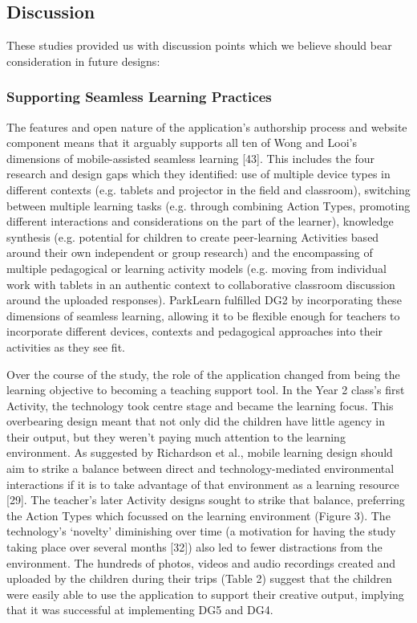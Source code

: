 \subsection{Discussion}
\label{sec:TeacherDiscussion}
These studies provided us with discussion points which we believe should bear consideration in future designs:

\subsubsection{Supporting Seamless Learning Practices}

The features and open nature of the application’s authorship process and website component means that it arguably supports all ten of Wong and Looi’s dimensions of mobile-assisted seamless learning [43].  This includes the four research and design gaps which they identified: use of multiple device types in different contexts (e.g. tablets and projector in the field and classroom), switching between multiple learning tasks (e.g. through combining Action Types, promoting different interactions and considerations on the part of the learner), knowledge synthesis (e.g. potential for children to create peer-learning Activities based around their own independent or group research) and the encompassing of multiple pedagogical or learning activity models (e.g. moving from individual work with tablets in an authentic context to collaborative classroom discussion around the uploaded responses). ParkLearn fulfilled DG2 by incorporating these dimensions of seamless learning, allowing it to be flexible enough for teachers to incorporate different devices, contexts and pedagogical approaches into their activities as they see fit.
  
Over the course of the study, the role of the application changed from being the learning objective to becoming a teaching support tool. In the Year 2 class’s first Activity, the technology took centre stage and became the learning focus. This overbearing design meant that not only did the children have little agency in their output, but they weren’t paying much attention to the learning environment. As suggested by Richardson et al., mobile learning design should aim to strike a balance between direct and technology-mediated environmental interactions if it is to take advantage of that environment as a learning resource [29]. The teacher’s later Activity designs sought to strike that balance, preferring the Action Types which focussed on the learning environment (Figure 3). The technology’s ‘novelty’ diminishing over time (a motivation for having the study taking place over several months [32]) also led to fewer distractions from the environment. The hundreds of photos, videos and audio recordings created and uploaded by the children during their trips (Table 2) suggest that the children were easily able to use the application to support their creative output, implying that it was successful at implementing DG5 and DG4.

